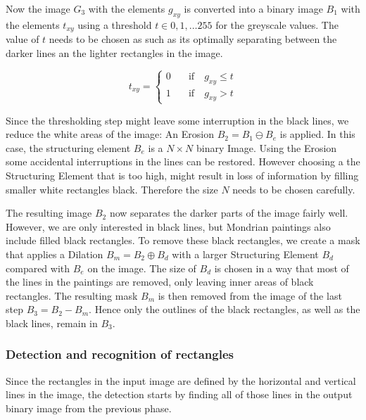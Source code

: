 Now the image $G_3$ with the elements $g_{xy}$ is converted into a binary image
$B_1$ with the elements $t_{xy}$ using a threshold $t \in 0,1,\dots255$ for the
greyscale values. The value of $t$ needs to be chosen as such as its optimally
separating between the darker lines an the lighter rectangles in the image.

\begin{equation}
  t_{xy} =
  \begin{cases}
    0 & \quad  \text{if}  \quad g_{xy} \leq t\\
    1  & \quad \text{if}  \quad g_{xy} > t
  \end{cases}
\end{equation}

Since the thresholding step might leave some interruption in the black lines, we
reduce the white areas of the image: An Erosion $B_2 = B_1 \ominus B_e$ is
applied. In this case, the structuring element $B_e$ is a $N\times N$ binary
Image. Using the Erosion some accidental interruptions in the lines can be
restored. However choosing a the Structuring Element that is too high, might
result in loss of information by filling smaller white rectangles black.
Therefore the size $N$ needs to be chosen carefully.

The resulting image $B_2$ now separates the darker parts of the image fairly
well. However, we are only interested in black lines, but Mondrian paintings
also include filled black rectangles. To remove these black rectangles, we
create a mask that applies a Dilation $B_m = B_2 \oplus B_d$ with a larger
Structuring Element $B_d$ compared with $B_e$ on the image. The size of $B_d$ is
chosen in a way that most of the lines in the paintings are removed, only
leaving inner areas of black rectangles. The resulting mask $B_m$ is then
removed from the image of the last step $B_3 = B_2 - B_m$. Hence only the
outlines of the black rectangles, as well as the black lines, remain in $B_3$.


\subsubsection{Detection and recognition of rectangles} \label{rectangles}

Since the rectangles in the input image are defined by the horizontal and
vertical lines in the image, the detection starts by finding all of those lines
in the output binary image from the previous phase.


